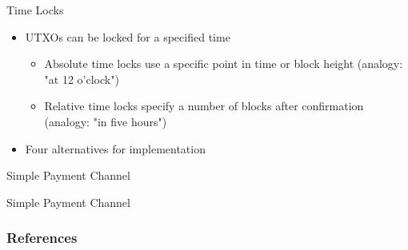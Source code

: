 \documentclass[handout]{beamer}
\begin{document}
\begin{frame}{Time Locks}
	\begin{itemize}
		\item<1-> UTXOs can be locked for a specified time
		\begin{itemize}
			\item<2-> Absolute time locks use a specific point in time or block height (analogy: "at 12 o'clock")
			\item<2-> Relative time locks specify a number of blocks after confirmation (analogy: "in five hours")
		\end{itemize}
		\item<3 -> Four alternatives for implementation
	\end{itemize}
	\vspace{0.25cm}
\end{frame}


\begin{frame}{Simple Payment Channel}
	
\end{frame}


\begin{frame}{Simple Payment Channel}
	
\end{frame}


\begin{frame}%
	\frametitle{References}
	
	
\end{frame}
\end{document}
